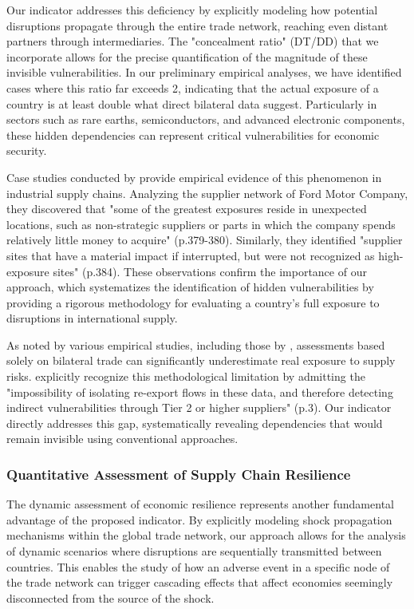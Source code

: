 \documentclass[final,1p,times,authoryear]{elsarticle}
\begin{document}
Our indicator addresses this deficiency by explicitly modeling how potential disruptions propagate through the entire trade network, reaching even distant partners through intermediaries. The "concealment ratio" (DT/DD) that we incorporate allows for the precise quantification of the magnitude of these invisible vulnerabilities. In our preliminary empirical analyses, we have identified cases where this ratio far exceeds 2, indicating that the actual exposure of a country is at least double what direct bilateral data suggest. Particularly in sectors such as rare earths, semiconductors, and advanced electronic components, these hidden dependencies can represent critical vulnerabilities for economic security.

Case studies conducted by \citet{SimchiLevi2015} provide empirical evidence of this phenomenon in industrial supply chains. Analyzing the supplier network of Ford Motor Company, they discovered that "some of the greatest exposures reside in unexpected locations, such as non-strategic suppliers or parts in which the company spends relatively little money to acquire" (p.379-380). Similarly, they identified "supplier sites that have a material impact if interrupted, but were not recognized as high-exposure sites" (p.384). These observations confirm the importance of our approach, which systematizes the identification of hidden vulnerabilities by providing a rigorous methodology for evaluating a country's full exposure to disruptions in international supply.

As noted by various empirical studies, including those by \citet{Vicard2023}, assessments based solely on bilateral trade can significantly underestimate real exposure to supply risks. \citet{Bonneau2020} explicitly recognize this methodological limitation by admitting the "impossibility of isolating re-export flows in these data, and therefore detecting indirect vulnerabilities through Tier 2 or higher suppliers" (p.3). Our indicator directly addresses this gap, systematically revealing dependencies that would remain invisible using conventional approaches.

\subsubsection{Quantitative Assessment of Supply Chain Resilience}

The dynamic assessment of economic resilience represents another fundamental advantage of the proposed indicator. By explicitly modeling shock propagation mechanisms within the global trade network, our approach allows for the analysis of dynamic scenarios where disruptions are sequentially transmitted between countries. This enables the study of how an adverse event in a specific node of the trade network can trigger cascading effects that affect economies seemingly disconnected from the source of the shock.
\end{document}
